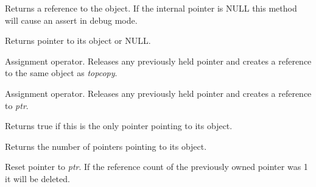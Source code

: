 \label{wxsharedptroperatorreft}


Returns a reference to the object. If the internal pointer is NULL this
method will cause an assert in debug mode.

\label{wxsharedptroperatorderef}


Returns pointer to its object or NULL.

\label{wxsharedptroperatorassign}


Assignment operator. Releases any previously held pointer
and creates a reference to the same object as {\it topcopy}.

\label{wxsharedptroperatorassign2}


Assignment operator. Releases any previously held pointer
and creates a reference to {\it ptr}.

\label{wxsharedptrunique}


Returns true if this is the only pointer pointing to its object.

\label{wxsharedptruse\_count}


Returns the number of pointers pointing to its object.

\label{wxsharedptrreset}


Reset pointer to {\it ptr}. If the reference count of the
previously owned pointer was 1 it will be deleted.

